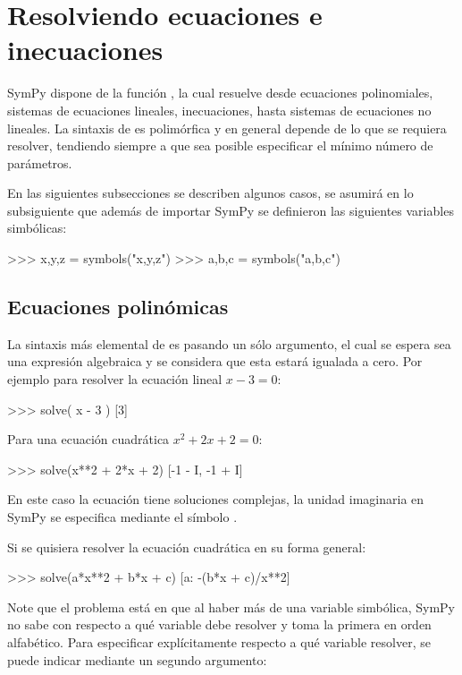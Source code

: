 \section{Resolviendo ecuaciones e inecuaciones}

SymPy dispone de la función , la cual resuelve desde ecuaciones polinomiales, sistemas de ecuaciones lineales, 
inecuaciones, hasta sistemas de ecuaciones no lineales. La sintaxis de  es polimórfica y en general depende 
de lo que se requiera resolver, tendiendo siempre a que sea posible especificar el mínimo número de parámetros.

En las siguientes subsecciones se describen algunos casos, se asumirá en lo subsiguiente que además de importar SymPy 
se definieron las siguientes variables simbólicas:

\begin{python}
>>> x,y,z = symbols("x,y,z")
>>> a,b,c = symbols("a,b,c")
\end{python}

\subsection{Ecuaciones polinómicas}

La sintaxis más elemental de  es pasando un sólo argumento, el cual se espera sea una expresión algebraica 
y se considera que esta estará igualada a cero. Por ejemplo para resolver la ecuación lineal $ x - 3 = 0 $:

\begin{python}
>>> solve( x - 3 )
[3]
\end{python}

Para una ecuación cuadrática $ x^2 + 2x + 2 = 0 $: 

\begin{python}
>>> solve(x**2 + 2*x + 2)
[-1 - I, -1 + I]
\end{python}

En este caso la ecuación tiene soluciones complejas, la unidad imaginaria en SymPy se especifica mediante 
el símbolo .

Si se quisiera resolver la ecuación cuadrática en su forma general:

\begin{python}
>>> solve(a*x**2 + b*x + c)
[{a: -(b*x + c)/x**2}]
\end{python}

Note que el problema está en que al haber más de una variable simbólica, SymPy no sabe con respecto a qué variable debe 
resolver y toma la primera en orden alfabético. Para especificar explícitamente respecto a qué variable resolver, 
se puede indicar mediante un segundo argumento:

